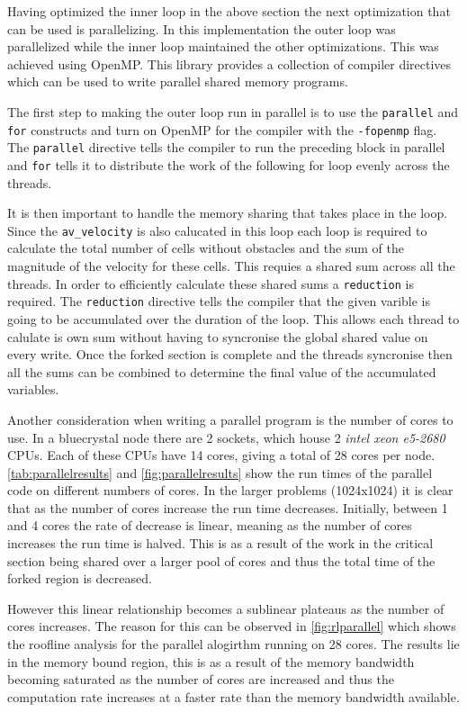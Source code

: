\documentclass{article}
\begin{document}
\begin{multicols}{2}
Having optimized the inner loop in the above section the next optimization that
can be used is parallelizing. In this implementation the outer loop was
parallelized while the inner loop maintained the other optimizations. This was
achieved using OpenMP. This library provides a collection of compiler
directives which can be used to write parallel shared memory programs.

The first step to making the outer loop run in parallel is to use the
\verb|parallel| and \verb|for| constructs and turn on OpenMP for the compiler with the
\verb|-fopenmp| flag. The \verb|parallel| directive tells the compiler to run
the preceding block in parallel and \verb|for| tells it to distribute the
work of the following for loop evenly across the threads.

It is then important to handle the memory sharing that takes place in the loop.
Since the \verb|av_velocity| is also calucated in this loop each loop is
required to calculate the total number of cells without obstacles and the sum
of the magnitude of the velocity for these cells. This requies a shared sum
across all the threads. In order to efficiently calculate these shared sums a
\verb|reduction| is required. The \verb|reduction| directive tells the compiler
that the given varible is going to be accumulated over the duration of the loop.
This allows each thread to calulate is own sum without having to syncronise the
global shared value on every write. Once the forked section is complete and the threads
syncronise then all the sums can be combined to determine the final value of
the accumulated variables. 

Another consideration when writing a parallel program is the number of cores
to use. In a bluecrystal node there are 2 sockets, which house 2 \emph{intel
xeon e5-2680} CPUs. Each of these CPUs have 14 cores, giving a total of 28
cores per node. \autoref{tab:parallelresults} and \autoref{fig:parallelresults}
show the run times of the parallel code on different numbers of cores. In the
larger problems (1024x1024) it is clear that as the number of cores increase
the run time decreases. Initially, between 1 and 4 cores the rate of decrease
is linear, meaning as the number of cores increases the run time is halved.
This is as a result of the work in the critical section being shared over a
larger pool of cores and thus the total time of the forked region is decreased.

However this linear relationship becomes a sublinear plateaus as the number of
cores increases. The reason for this can be observed in
\autoref{fig:rlparallel} which shows the roofline analysis for the parallel
alogirthm running on 28 cores. The results lie in the memory bound region,
this is as a result of the memory bandwidth becoming saturated as the number of
cores are increased and thus the computation rate increases at a faster rate
than the memory bandwidth available. 


\end{multicols}
\end{document}
